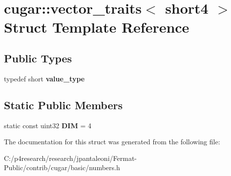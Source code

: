 \hypertarget{structcugar_1_1vector__traits_3_01short4_01_4}{}\section{cugar\+:\+:vector\+\_\+traits$<$ short4 $>$ Struct Template Reference}
\label{structcugar_1_1vector__traits_3_01short4_01_4}
\subsection*{Public Types}
\begin{DoxyCompactItemize}
\item 
\mbox{\label{structcugar_1_1vector__traits_3_01short4_01_4_ab1b37565c1ba6c5a7b182468dfc37eff}} 
typedef short {\bfseries value\+\_\+type}
\end{DoxyCompactItemize}
\subsection*{Static Public Members}
\begin{DoxyCompactItemize}
\item 
\mbox{\label{structcugar_1_1vector__traits_3_01short4_01_4_a7f3cb4df94ab86b3b56194654c294916}} 
static const uint32 {\bfseries D\+IM} = 4
\end{DoxyCompactItemize}


The documentation for this struct was generated from the following file\+:\begin{DoxyCompactItemize}
\item 
C\+:/p4research/research/jpantaleoni/\+Fermat-\/\+Public/contrib/cugar/basic/numbers.\+h\end{DoxyCompactItemize}
